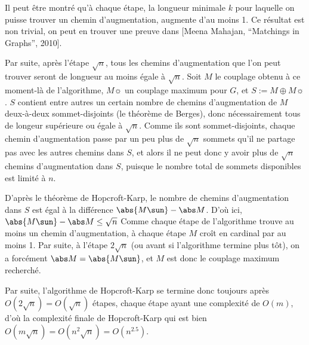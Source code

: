  Il peut être montré qu'à chaque étape, la longueur minimale $k$ pour laquelle on puisse trouver un chemin d'augmentation, augmente d'au moins 1. Ce résultat est non trivial, on peut en trouver une preuve dans [Meena Mahajan, ``Matchings in Graphs'', 2010].
 
 Par suite, après l'étape $\sqrt n$, tous les chemins d'augmentation que l'on peut trouver seront de longueur au moins égale à $\sqrt n$. Soit $M$ le couplage obtenu à ce moment-là de l'algorithme, $M\sun$ un couplage maximum pour $G$, et $S := M \oplus M\sun$. $S$ contient entre autres un certain nombre de chemins d'augmentation de $M$ deux-à-deux sommet-disjoints (\cf le théorème de Berges), donc nécessairement tous de longeur supérieure ou égale à $\sqrt n$. Comme ils sont sommet-disjoints, chaque chemin d'augmentation passe par un peu plus de $\sqrt n$ sommets qu'il ne partage pas avec les autres chemins dans $S$, et alors il ne peut donc y avoir plus de $\sqrt n$ chemins d'augmentation dans $S$, puisque le nombre total de sommets disponibles est limité à $n$.
 
 D'après le théorème de Hopcroft-Karp, le nombre de chemins d'augmentation dans $S$ est égal à la différence $\abs {M\sun} - \abs M$. D'où ici, $\abs {M\sun} - \abs M \leq \sqrt n$ Comme chaque étape de l'algorithme trouve au moins un chemin d'augmentation, à chaque étape $M$ croît en cardinal par au moins 1. Par suite, à l'étape $2 \sqrt n$ (ou avant si l'algorithme termine plus tôt), on a forcément $\abs M = \abs {M\sun}$, et $M$ est donc le couplage maximum recherché.
 
 Par suite, l'algorithme de Hopcroft-Karp se termine donc toujours après $O(2\sqrt n) = O(\sqrt n)$ étapes, chaque étape ayant une complexité de $O(m)$, d'où la complexité finale de Hopcroft-Karp qui est bien $O(m \sqrt n) = O(n^2 \sqrt n) = O(n^{2.5})$.
 

